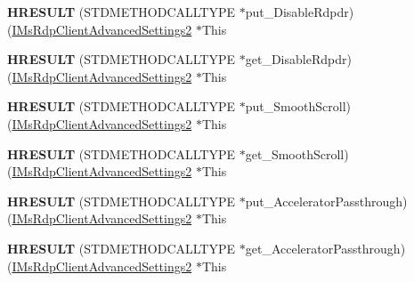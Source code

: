 \begin{DoxyCompactItemize}
{\bfseries H\+R\+E\+S\+U\+LT} (S\+T\+D\+M\+E\+T\+H\+O\+D\+C\+A\+L\+L\+T\+Y\+PE $\ast$put\+\_\+\+Disable\+Rdpdr)(\hyperlink{interface_m_s_t_s_c_lib_1_1_i_ms_rdp_client_advanced_settings2}{I\+Ms\+Rdp\+Client\+Advanced\+Settings2} $\ast$This
\item 
\mbox{\label{struct_m_s_t_s_c_lib_1_1_i_ms_rdp_client_advanced_settings2_vtbl_a02fcdf716ea812142b9df11a4cd6da31}} 
{\bfseries H\+R\+E\+S\+U\+LT} (S\+T\+D\+M\+E\+T\+H\+O\+D\+C\+A\+L\+L\+T\+Y\+PE $\ast$get\+\_\+\+Disable\+Rdpdr)(\hyperlink{interface_m_s_t_s_c_lib_1_1_i_ms_rdp_client_advanced_settings2}{I\+Ms\+Rdp\+Client\+Advanced\+Settings2} $\ast$This
\item 
\mbox{\label{struct_m_s_t_s_c_lib_1_1_i_ms_rdp_client_advanced_settings2_vtbl_a9f044d6951b4bb47e16b12006e66f2c2}} 
{\bfseries H\+R\+E\+S\+U\+LT} (S\+T\+D\+M\+E\+T\+H\+O\+D\+C\+A\+L\+L\+T\+Y\+PE $\ast$put\+\_\+\+Smooth\+Scroll)(\hyperlink{interface_m_s_t_s_c_lib_1_1_i_ms_rdp_client_advanced_settings2}{I\+Ms\+Rdp\+Client\+Advanced\+Settings2} $\ast$This
\item 
\mbox{\label{struct_m_s_t_s_c_lib_1_1_i_ms_rdp_client_advanced_settings2_vtbl_a5c67b66b515970205940dac17ad07f27}} 
{\bfseries H\+R\+E\+S\+U\+LT} (S\+T\+D\+M\+E\+T\+H\+O\+D\+C\+A\+L\+L\+T\+Y\+PE $\ast$get\+\_\+\+Smooth\+Scroll)(\hyperlink{interface_m_s_t_s_c_lib_1_1_i_ms_rdp_client_advanced_settings2}{I\+Ms\+Rdp\+Client\+Advanced\+Settings2} $\ast$This
\item 
\mbox{\label{struct_m_s_t_s_c_lib_1_1_i_ms_rdp_client_advanced_settings2_vtbl_a78e387bd56aad8336772ba61fc130d6c}} 
{\bfseries H\+R\+E\+S\+U\+LT} (S\+T\+D\+M\+E\+T\+H\+O\+D\+C\+A\+L\+L\+T\+Y\+PE $\ast$put\+\_\+\+Accelerator\+Passthrough)(\hyperlink{interface_m_s_t_s_c_lib_1_1_i_ms_rdp_client_advanced_settings2}{I\+Ms\+Rdp\+Client\+Advanced\+Settings2} $\ast$This
\item 
\mbox{\label{struct_m_s_t_s_c_lib_1_1_i_ms_rdp_client_advanced_settings2_vtbl_acf0c1fc696f807c342ab02a2a4f93b88}} 
{\bfseries H\+R\+E\+S\+U\+LT} (S\+T\+D\+M\+E\+T\+H\+O\+D\+C\+A\+L\+L\+T\+Y\+PE $\ast$get\+\_\+\+Accelerator\+Passthrough)(\hyperlink{interface_m_s_t_s_c_lib_1_1_i_ms_rdp_client_advanced_settings2}{I\+Ms\+Rdp\+Client\+Advanced\+Settings2} $\ast$This

\end{DoxyCompactItemize}
